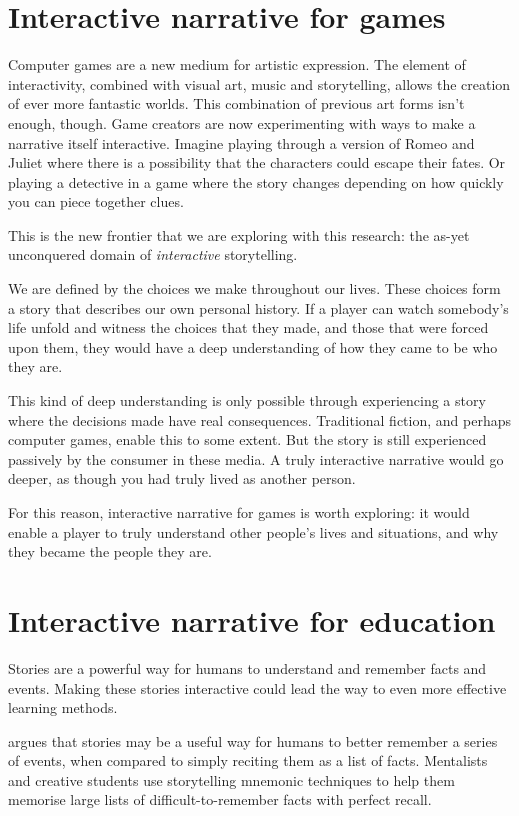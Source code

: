 \section{Interactive narrative for games}
Computer games are a new medium for artistic expression. The element of interactivity, combined with visual art, music and storytelling, allows the creation of ever more fantastic worlds. This combination of previous art forms isn't enough, though. Game creators are now experimenting with ways to make a narrative itself interactive. Imagine playing through a version of Romeo and Juliet where there is a possibility that the characters could escape their fates. Or playing a detective in a game where the story changes depending on how quickly you can piece together clues.

This is the new frontier that we are exploring with this research: the as-yet unconquered domain of \emph{interactive} storytelling.

We are defined by the choices we make throughout our lives. These choices form a story that describes our own personal history. If a player can watch somebody's life unfold and witness the choices that they made, and those that were forced upon them, they would have a deep understanding of how they came to be who they are.

This kind of deep understanding is only possible through experiencing a story where the decisions made have real consequences. Traditional fiction, and perhaps computer games, enable this to some extent. But the story is still experienced passively by the consumer in these media. A truly interactive narrative would go deeper, as though you had truly lived as another person.

For this reason, interactive narrative for games is worth exploring: it would
enable a player to truly understand other people's lives and situations, and why they became the people they are.


\section{Interactive narrative for education}
Stories are a powerful way for humans to understand and remember facts and events. Making these stories interactive could lead the way to even more effective learning methods.

\citet{schank1990tell} argues that stories may be a useful way for humans to better remember a series of events, when compared to simply reciting them as a list of facts. Mentalists and creative students use storytelling mnemonic techniques to help them memorise large lists of difficult-to-remember facts with perfect recall.

